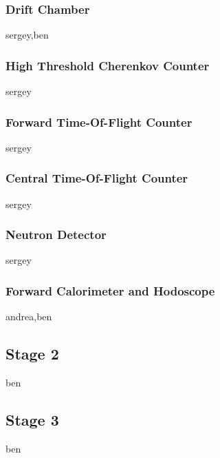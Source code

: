 \subsubsection{Drift Chamber} sergey,ben

\subsubsection{High Threshold Cherenkov Counter} sergey

\subsubsection{Forward Time-Of-Flight Counter} sergey

\subsubsection{Central Time-Of-Flight Counter} sergey

\subsubsection{Neutron Detector} sergey

\subsubsection{Forward Calorimeter and Hodoscope} andrea,ben


\subsection{Stage 2} ben


\subsection{Stage 3} ben

